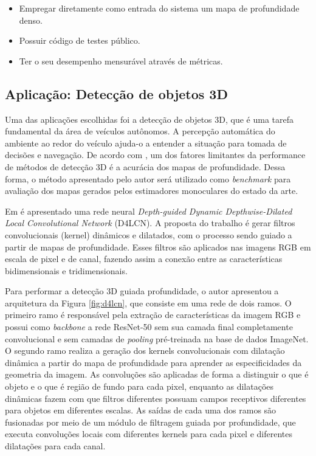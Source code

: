 \begin{itemize}
    \item Empregar diretamente como entrada do sistema um mapa de profundidade denso.
    \item Possuir código de testes público.
    \item Ter o seu desempenho mensurável através de métricas. 
\end{itemize}

\subsection{Aplicação: Detecção de objetos 3D}

Uma das aplicações escolhidas foi a detecção de objetos 3D, que é uma tarefa fundamental da área de veículos autônomos. A percepção automática do ambiente ao redor do veículo ajuda-o a entender a situação para tomada de decisões e navegação. De acordo com , um dos fatores limitantes da performance de métodos de detecção 3D é a acurácia dos mapas de profundidade. Dessa forma, o método apresentado pelo autor será utilizado como \textit{benchmark} para avaliação dos mapas gerados pelos estimadores monoculares do estado da arte.

Em  é apresentado uma rede neural \textit{Depth-guided Dynamic Depthwise-Dilated Local Convolutional Network} (D4LCN). A proposta do trabalho é gerar filtros convolucionais (kernel) dinâmicos e dilatados, com o processo sendo guiado a partir de mapas de profundidade. Esses filtros são aplicados nas imagens RGB em escala de pixel e de canal, fazendo assim a conexão entre as características bidimensionais e tridimensionais.


Para performar a detecção 3D guiada profundidade, o autor apresentou a arquitetura da Figura \ref{fig:d4lcn}, que consiste em uma rede de dois ramos. O primeiro ramo é responsável pela extração de características da imagem RGB e possui como \textit{backbone} a rede ResNet-50 sem sua camada final completamente convolucional e sem camadas de \textit{pooling} pré-treinada na base de dados ImageNet. O segundo ramo realiza a geração dos kernels convolucionais com dilatação dinâmica a partir do mapa de profundidade para aprender as especificidades da geometria da imagem. As convoluções são aplicadas de forma a distinguir o que é objeto e o que é região de fundo para cada pixel, enquanto as dilatações dinâmicas fazem com que filtros diferentes possuam campos receptivos diferentes para objetos em diferentes escalas. As saídas de cada uma dos ramos são fusionadas por meio de um módulo de filtragem guiada por profundidade, que executa convoluções locais com diferentes kernels para cada pixel e diferentes dilatações para cada canal. 




